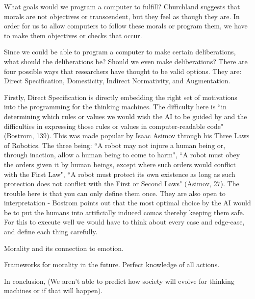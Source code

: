 \documentclass[11pt, oneside]{article}
\begin{document}
\par What goals would we program a computer to fulfill? Churchland suggests that morals are not objectives or transcendent, but they feel as though they are. In order for us to allow computers to follow these morals or program them, we have to make them objectives or checks that occur. 

\par Since we could be able to program a computer to make certain deliberations, what should the deliberations be? Should we even make deliberations? There are four possible ways that researchers have thought to be valid options. They are: Direct Specification, Domesticity, Indirect Normativity, and Augmentation.

\par Firstly, Direct Specification is directly embedding the right set of motivations into the programming for the thinking machines. The difficulty here is ``in determining which rules or values we would wish the AI to be guided by and the difficulties in expressing those rules or values in computer-readable code" (Bostrom, 139). This was made popular by Isaac Asimov through his Three Laws of Robotics. The three being: ``A robot may not injure a human being or, through inaction, allow a human being to come to harm", ``A robot must obey the orders given it by human beings, except where such orders would conflict with the First Law", ``A robot must protect its own existence as long as such protection does not conflict with the First or Second Laws" (Asimov, 27). The trouble here is that you can only define them once. They are also open to interpretation - Bostrom points out that the most optimal choice by the AI would be to put the humans into artificially induced comas thereby keeping them safe. For this to execute well we would have to think about every case and edge-case, and define each thing carefully. 

\par 

\par Morality and its connection to emotion.

\par Frameworks for morality in the future. Perfect knowledge of all actions. 

\par In conclusion, (We aren't able to predict how society will evolve for thinking machines or if that will happen).
\end{document}
